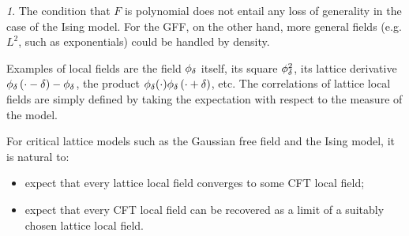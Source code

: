 \documentclass[12pt,oneside,english]{amsart}
\numberwithin{equation}{section}
\numberwithin{figure}{section}
\theoremstyle{plain}
\theoremstyle{plain}
\theoremstyle{plain}
\theoremstyle{plain}
\theoremstyle{remark}
\newtheorem{rem}[thm]{\protect\remarkname}
\theoremstyle{definition}
\theoremstyle{plain}
\theoremstyle{plain}
\numberwithin{thm}{section}
\providecommand{\remarkname}{Remark}
\providecommand{\remarkname}{Remark}
\providecommand{\remarkname}{Remark}
\providecommand{\remarkname}{Remark}
\begin{document}
\begin{rem}
The condition that $F$ is polynomial %
does not entail any loss of generality in the case of the
Ising model. For the GFF, on the other hand, more general fields (e.g. $L^{2}$, 
such as exponentials) could be handled by density. 
\end{rem}

Examples of local fields are the field ${\phi}_{ {\delta}}$ itself,
its square ${\phi}_{ {\delta}}^{2}$, its lattice derivative 
${\phi}_{ {\delta}}\left(\cdot- {\delta}\right)-{\phi}_{ {\delta}}$,
the product ${\phi}_{ 
{\delta}}( \cdot ) {\phi}_{ {\delta}}\left(\cdot+ {\delta}\right)$, etc.
The correlations of lattice
local fields are simply defined by taking the expectation with respect
to the measure of the model.

For critical lattice models such as the Gaussian free field and the
Ising model, it is natural to:
\begin{itemize}
\item expect that every lattice local field converges to some CFT 
local field;
\item expect that every CFT local field can be recovered 
as a limit of a suitably chosen lattice local field. 
\end{itemize}
\end{document}
